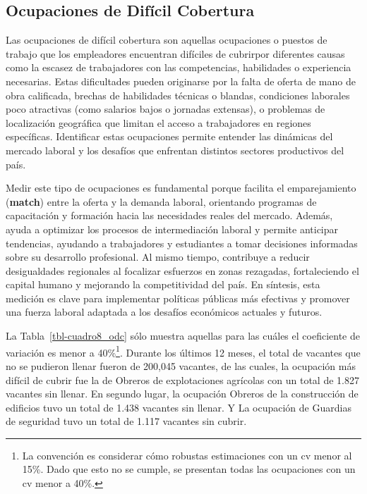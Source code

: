 \documentclass[
  11pt,
]{article}
\begin{document}
\subsection{Ocupaciones de Difícil
Cobertura}\label{ocupaciones-de-difuxedcil-cobertura}

Las ocupaciones de difícil cobertura son aquellas ocupaciones o puestos
de trabajo que los empleadores encuentran difíciles de cubrirpor
diferentes causas como la escasez de trabajadores con las competencias,
habilidades o experiencia necesarias. Estas dificultades pueden
originarse por la falta de oferta de mano de obra calificada, brechas de
habilidades técnicas o blandas, condiciones laborales poco atractivas
(como salarios bajos o jornadas extensas), o problemas de localización
geográfica que limitan el acceso a trabajadores en regiones específicas.
Identificar estas ocupaciones permite entender las dinámicas del mercado
laboral y los desafíos que enfrentan distintos sectores productivos del
país.

Medir este tipo de ocupaciones es fundamental porque facilita el
emparejamiento (\textbf{match}) entre la oferta y la demanda laboral,
orientando programas de capacitación y formación hacia las necesidades
reales del mercado. Además, ayuda a optimizar los procesos de
intermediación laboral y permite anticipar tendencias, ayudando a
trabajadores y estudiantes a tomar decisiones informadas sobre su
desarrollo profesional. Al mismo tiempo, contribuye a reducir
desigualdades regionales al focalizar esfuerzos en zonas rezagadas,
fortaleciendo el capital humano y mejorando la competitividad del país.
En síntesis, esta medición es clave para implementar políticas públicas
más efectivas y promover una fuerza laboral adaptada a los desafíos
económicos actuales y futuros.

La Tabla~\ref{tbl-cuadro8_odc} sólo muestra aquellas para las cuáles el
coeficiente de variación es menor a 40\%\footnote{La convención es
  considerar cómo robustas estimaciones con un cv menor al 15\%. Dado
  que esto no se cumple, se presentan todas las ocupaciones con un cv
  menor a 40\%.}. Durante los últimos 12 meses, el total de vacantes que
no se pudieron llenar fueron de 200,045 vacantes, de las cuales, la
ocupación más difícil de cubrir fue la de Obreros de explotaciones
agrícolas con un total de 1.827 vacantes sin llenar. En segundo lugar,
la ocupación Obreros de la construcción de edificios tuvo un total de
1.438 vacantes sin llenar. Y La ocupación de Guardias de seguridad tuvo
un total de 1.117 vacantes sin cubrir.
\end{document}
